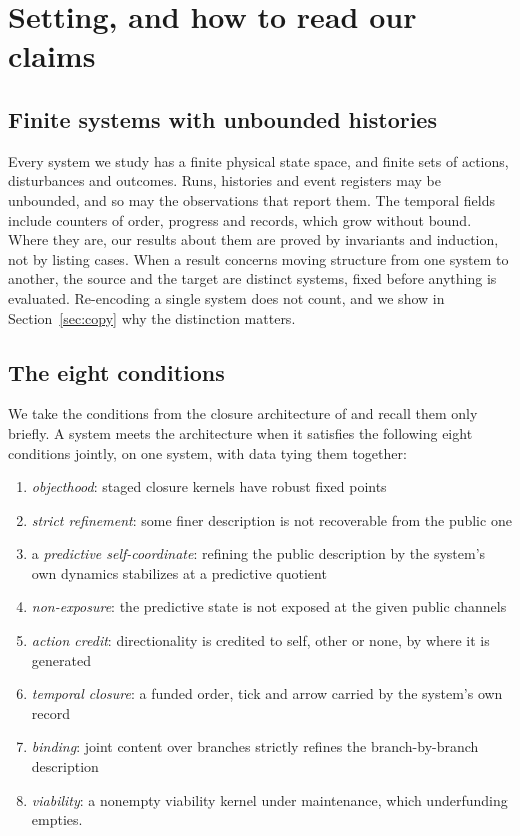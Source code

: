 \section{Setting, and how to read our claims}
\label{sec:setting}

\subsection{Finite systems with unbounded histories}

Every system we study has a finite physical state space, and finite sets of
actions, disturbances and outcomes. Runs, histories and event registers may be
unbounded, and so may the observations that report them. The temporal fields
include counters of order, progress and records, which grow without bound. Where they are,
our results about them are proved by invariants and induction, not by listing
cases. When a result concerns moving structure from one system to another,
the source and the target are distinct systems, fixed before anything is
evaluated. Re-encoding a single system does not count, and we show in
Section~\ref{sec:copy} why the distinction matters.

\subsection{The eight conditions}

We take the conditions from the closure architecture of
\citet{TsiokosArchitecture2026} and recall them only briefly. A system meets the
architecture when it satisfies the following eight conditions jointly, on one
system, with data tying them together:
\begin{enumerate}
\item \emph{objecthood}: staged closure kernels have robust fixed points
\item \emph{strict refinement}: some finer description is not recoverable from
the public one
\item a \emph{predictive self-coordinate}: refining the public description by
the system's own dynamics stabilizes at a predictive quotient
\item \emph{non-exposure}: the predictive state is not exposed at the given
public channels
\item \emph{action credit}: directionality is credited to self, other or none,
by where it is generated
\item \emph{temporal closure}: a funded order, tick and arrow carried by the
system's own record
\item \emph{binding}: joint content over branches strictly refines the
branch-by-branch description
\item \emph{viability}: a nonempty viability kernel under maintenance, which
underfunding empties.
\end{enumerate}

